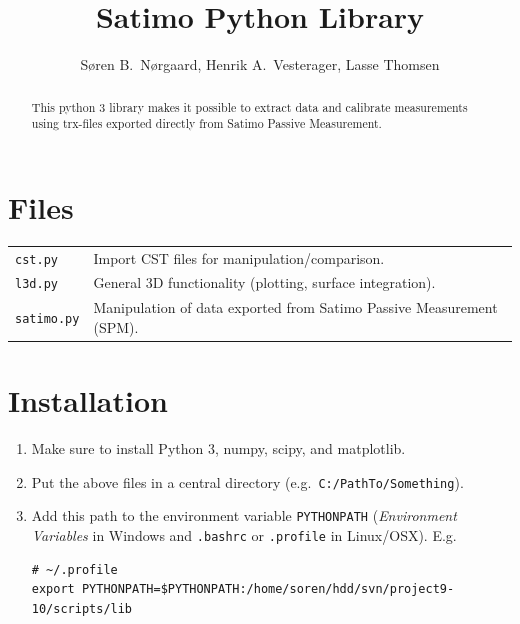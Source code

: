 \documentclass[10pt]{article}
\title{Satimo Python Library}
\author{Søren B.\ Nørgaard, Henrik A.\ Vesterager, Lasse Thomsen}
\begin{document}
\maketitle

\begin{abstract}
    This python 3 library makes it possible to extract data and calibrate measurements using trx-files exported directly from Satimo Passive Measurement.
\end{abstract}

\section{Files}
\begin{tabularx}{\linewidth}{lX}
    \texttt{cst.py} & Import CST files for manipulation/comparison. \\
    \texttt{l3d.py} & General 3D functionality (plotting, surface integration). \\
    \texttt{satimo.py} & Manipulation of data exported from Satimo Passive Measurement (SPM). 
\end{tabularx}

\section{Installation}
\begin{enumerate}
\item Make sure to install Python 3, numpy, scipy, and matplotlib.
\item Put the above files in a central directory (e.g.\ \texttt{C:/PathTo/Something}).
\item Add this path to the environment variable \texttt{PYTHONPATH} (\emph{Environment Variables} in Windows and \texttt{.bashrc} or \texttt{.profile} in Linux/OSX). E.g.\
    \begin{verbatim}
# ~/.profile
export PYTHONPATH=$PYTHONPATH:/home/soren/hdd/svn/project9-10/scripts/lib
    \end{verbatim}
\end{enumerate}
\end{document}
